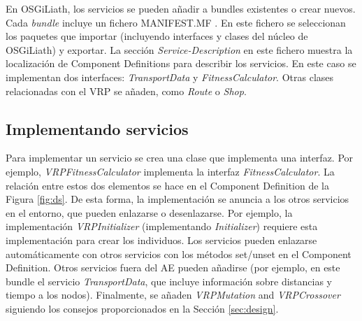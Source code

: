 \documentclass[runningheads]{llncs}
\begin{document}
En OSGiLiath, los servicios se pueden añadir a bundles existentes o crear nuevos. Cada {\em bundle} incluye un fichero MANIFEST.MF . En este fichero se seleccionan los paquetes que importar (incluyendo interfaces y clases del núcleo de OSGiLiath) y exportar. La sección {\em Service-Description} en este fichero muestra la localización de Component Definitions para describir los servicios. En este caso se implementan dos interfaces: {\em TransportData} y {\em FitnessCalculator}. Otras clases relacionadas con el VRP se añaden, como {\em Route} o {\em Shop}.


\subsection{Implementando servicios}
Para implementar un servicio se crea una clase que implementa una interfaz. Por ejemplo,  {\em VRPFitnessCalculator} implementa la interfaz {\em FitnessCalculator}. La relación entre estos dos elementos se hace en el Component Definition de la Figura \ref{fig:ds}. De esta forma, la implementación se anuncia a los otros servicios en el entorno, que pueden enlazarse o desenlazarse. Por ejemplo, la implementación {\em VRPInitializer} (implementando {\em Initializer}) requiere esta implementación para crear los individuos. Los servicios pueden enlazarse automáticamente con otros servicios con los métodos set/unset en el Component Definition. Otros servicios fuera del AE pueden añadirse (por ejemplo, en este bundle el servicio {\em TransportData}, que incluye información sobre distancias y tiempo a los nodos). Finalmente, se añaden {\em VRPMutation} and {\em VRPCrossover} siguiendo los consejos proporcionados en la Sección \ref{sec:design}.
\end{document}
